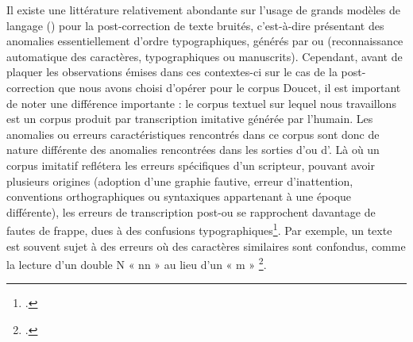 Il existe une littérature relativement abondante sur l’usage de grands modèles de langage (\llm) pour la post-correction de texte bruités, c’est-à-dire présentant des anomalies essentiellement d’ordre typographiques, générés par \ocr ou \htr (reconnaissance automatique des caractères, typographiques ou manuscrits). Cependant, avant de plaquer les observations émises dans ces contextes-ci sur le cas de la post-correction que nous avons choisi d’opérer pour le corpus Doucet, il est important de noter une différence importante : le corpus textuel sur lequel nous travaillons est un corpus produit par transcription imitative générée par l’humain. Les anomalies ou erreurs caractéristiques rencontrés dans ce corpus sont donc de nature différente des anomalies rencontrées dans les sorties d’\ocr ou d'\htr. Là où un corpus imitatif reflétera les erreurs spécifiques d’un scripteur, pouvant avoir plusieurs origines (adoption d’une graphie fautive, erreur d’inattention, conventions orthographiques ou syntaxiques appartenant à une époque différente), les erreurs de transcription post-\ocr ou \htr se rapprochent davantage de fautes de frappe, dues à des confusions typographiques\footcite{mitton_fifty_2010}. Par exemple, un texte \ocr est souvent sujet à des erreurs où des caractères similaires sont confondus, comme la lecture d’un double N « nn » au lieu d’un « m » \footcite[p.95]{baranes_vers_2012}.

\newline

